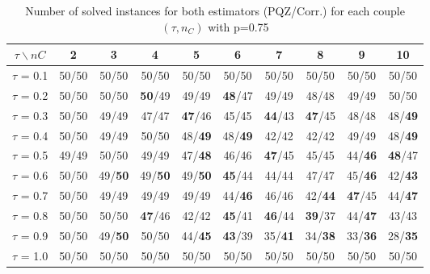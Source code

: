 \begin{table}[H]
\centering

\begin{tabular}{|c|c|c|c|c|c|c|c|c|c|}
\hline
$\tau \backslash nC$ & 2 & 3 & 4 & 5 & 6 & 7 & 8 & 9 & 10 \\
\hline
$\tau$ = 0.1 & 50/50 & 50/50 & 50/50 & 50/50 & 50/50 & 50/50 & 50/50 & 50/50 & 50/50 \\
\hline
$\tau$ = 0.2 & 50/50 & 50/50 & \textbf{50}/49 & 49/49 & \textbf{48}/47 & 49/49 & 48/48 & 49/49 & 50/50 \\
\hline
$\tau$ = 0.3 & 50/50 & 49/49 & 47/47 & \textbf{47}/46 & 45/45 & \textbf{44}/43 & \textbf{47}/45 & 48/48 & 48/\textbf{49} \\
\hline
$\tau$ = 0.4 & 50/50 & 49/49 & 50/50 & 48/\textbf{49} & 48/\textbf{49} & 42/42 & 42/42 & 49/49 & 48/\textbf{49} \\
\hline
$\tau$ = 0.5 & 49/49 & 50/50 & 49/49 & 47/\textbf{48} & 46/46 & \textbf{47}/45 & 45/45 & 44/\textbf{46} & \textbf{48}/47 \\
\hline
$\tau$ = 0.6 & 50/50 & 49/\textbf{50} & 49/\textbf{50} & 49/\textbf{50} & \textbf{45}/44 & 44/44 & 47/47 & 45/\textbf{46} & 42/\textbf{43} \\
\hline
$\tau$ = 0.7 & 50/50 & 49/49 & 49/49 & 49/49 & 44/\textbf{46} & 46/46 & 42/\textbf{44} & \textbf{47}/45 & 44/\textbf{47} \\
\hline
$\tau$ = 0.8 & 50/50 & 50/50 & \textbf{47}/46 & 42/42 & \textbf{45}/41 & \textbf{46}/44 & \textbf{39}/37 & 44/\textbf{47} & 43/43 \\
\hline
$\tau$ = 0.9 & 50/50 & 49/\textbf{50} & 50/50 & 44/\textbf{45} & \textbf{43}/39 & 35/\textbf{41} & 34/\textbf{38} & 33/\textbf{36} & 28/\textbf{35} \\
\hline
$\tau$ = 1.0 & 50/50 & 50/50 & 50/50 & 50/50 & 50/50 & 50/50 & 50/50 & 50/50 & 50/50 \\
\hline
\end{tabular}

~	\caption{Number of solved instances for both estimators (PQZ/Corr.) for each couple $(\tau, n_C)$ with p=0.75}
    \label{nbSolved075}
\end{table}